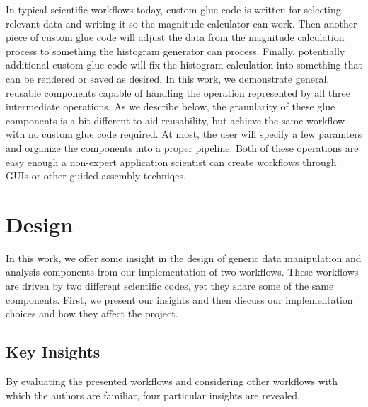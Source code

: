 \documentclass[conference]{IEEEtran}
\begin{document}
In typical scientific workflows today, custom glue code is written for
selecting relevant data and writing it so the magnitude calculator can work.
Then another piece of custom glue code will adjust the data from the magnitude
calculation process to something the histogram generator can process.  Finally,
potentially additional custom glue code will fix the histogram calculation into
something that can be rendered or saved as desired.  In this work, we
demonstrate general, reusable components capable of handling the operation
represented by all three intermediate operations. As we describe below, the
granularity of these glue components is a bit different to aid reusability, but
achieve the same workflow with no custom glue code required. At most, the user
will specify a few paramters and organize the components into a proper
pipeline. Both of these operations are easy enough a non-expert application
scientist can create workflows through GUIs or other guided assembly techniqes.

\section{Design}
\label{s:design}

In this work, we offer some insight in the design of generic data manipulation
and analysis components from our implementation of two workflows. These
workflows are driven by two different scientific codes, yet they share some of
the same components. First, we present our insights and then discuss our
implementation choices and how they affect the project.

\subsection{Key Insights}

By evaluating the presented workflows and considering other workflows with
which the authors are familiar, four particular insights are revealed.
\end{document}
